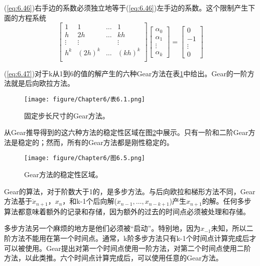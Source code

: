 (\ref{eq:6.46})右手边的系数必须独立地等于(\ref{eq:6.46})左手边的系数。这个限制产生下面的方程系统
\begin{equation}
\begin{bmatrix}
1 &1  &\dots  &1  \\
h &2h &\dots  &kh  \\
\vdots &\vdots  &  &\vdots  \\
h^k & (2h)^k &\dots  &(kh)^k  \\
\end{bmatrix}\begin{bmatrix}
\alpha_0 \\
\alpha_1 \\
\vdots \\
\alpha_k
\end{bmatrix}=\begin{bmatrix}
0 \\
-1 \\
\vdots \\
0
\end{bmatrix}
\label{eq:6.47}
\end{equation}

(\ref{eq:6.47})对于k从1到6的值的解产生的六种Gear方法在表\ref{表6.1}中给出。Gear的一阶方法就是后向欧拉方法。
\begin{figure}[htbp]
\small
    \centering
    \texttt{[image: figure/Chapter6/表6.1.png]}
    \caption{固定步长尺寸的Gear方法。}
    \label{表6.1}
\end{figure}

从Gear\cite{ref-66}推导得到的这六种方法的稳定性区域在图\ref{图6.5}中展示。只有一阶和二阶Gear方法是稳定的；然而，所有的Gear方法都是刚性稳定的。
\begin{figure}[htbp]
\small
    \centering
    \texttt{[image: figure/Chapter6/图6.5.png]}
    \caption{Gear方法的稳定性区域。}
    \label{图6.5}
\end{figure}

Gear的算法，对于阶数大于1的，是多步方法。与后向欧拉和梯形方法不同，Gear方法基于$\dot{x}_{n+1}$，$x_n$，和k-1个后向解($x_{n-1},\dots,x_{n-k+1}$)产生$x_{n+1}$的解。任何多步算法都意味着额外的记录和存储，因为额外的过去的时间点必须被处理和存储。

多步方法另一个麻烦的地方是他们必须被“启动”。特别地，因为$x_{-1}$未知，所以二阶方法不能用在第一个时间点。通常，k阶多步方法只有k-1个时间点计算完成后才可以被使用。Gear提出对第一个时间点使用一阶方法，对第二个时间点使用二阶方法，以此类推。六个时间点计算完成后，可以使用任意的Gear方法。

